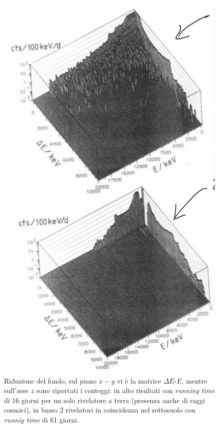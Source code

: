 \begin{figure}[!h]
	\centering
	\includegraphics[scale=0.5]{Immagini/0415_riv12.png}
	\caption{Riduzione del fondo, sul piano $x-y$ vi è la matrice $\Delta E$-$E$, mentre sull'asse $z$ sono riportati i conteggi: in alto risultati con \textit{running time} di 16 giorni per un solo rivelatore a terra (presenza anche di raggi cosmici), in basso 2 rivelatori in coincidenza nel sottosuolo con \textit{runnig time} di 61 giorni.}
	\label{0415_r1r2}
\end{figure}

